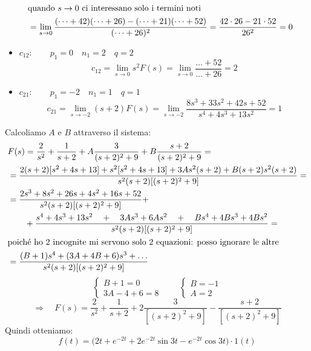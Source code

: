 \begin{mdframed}[style=Exercise]
\begin{Exercise}[title={Poli reali multipli, poli complessi semplici}, difficulty=2]
\begin{itemize}
\begin{align*}
					\intertext{quando $ s \rightarrow 0 $ ci interessano solo i termini noti}
					&= \lim\limits_{s \rightarrow 0} \frac{(\dots + 42)(\dots + 26)-(\dots+21)(\dots+52)}{(\dots+26)^2} = \frac{42 \cdot 26 - 21 \cdot 52}{26^2} = 0
				\end{align*}
				\item $ c_{12}: \qquad p_1=0 \quad n_1=2 \quad q=2 $
				\[ c_{12}= \lim\limits_{s \rightarrow 0} s^2F(s) = \lim\limits_{s \rightarrow 0} \frac{\dots + 52}{\dots + 26} = 2 \]
				\item $ c_{21}: \qquad p_1=-2 \quad n_1=1 \quad q=1 $
				\[ c_{21} = \lim\limits_{s \rightarrow -2} (s+2)F(s) = \lim\limits_{s \rightarrow -2} \frac{8s^3+33s^2+42s+52}{s^4+4s^3+13s^2} = 1\]
			\end{itemize}
			\smallskip
			Calcoliamo $ A $ e $ B $ attraverso il sistema:
			\begin{align*}
				&F(s) = \frac{2}{s^2} + \frac{1}{s+2} + A \frac{3}{(s+2)^2+9} + B \frac{s+2}{(s+2)^2+9} =
				\\
				&= \frac{2(s+2)[s^2+4s+13] + s^2[s^2+4s+13] + 3As^2(s+2) + B(s+2)s^2(s+2)}{s^2(s+2)[(s+2)^2+9]} =
				\\
				&= \frac{2s^3 + 8s^2 + 26s + 4s^2 + 16s + 52}{s^2(s+2)[(s+2)^2+9]} +
				\\
				&\qquad + \dfrac{s^4 + 4s^3 + 13s^2 \quad+\quad 3As^3+6As^2 \quad+\quad Bs^4+4Bs^3+4Bs^2}{s^2(s+2)[(s+2)^2+9]} =
				\\
				\intertext{poich\'{e} ho 2 incognite mi servono solo 2 equazioni: posso ignorare le altre}
				&= \frac{(B+1)s^4 + (3A+4B+6)s^3 + \dots}{s^2(s+2)[(s+2)^2+9]}
			\end{align*}
			\[
				\begin{cases}
					B+1=0\\
					3A-4+6=8
				\end{cases}\qquad 
				\begin{cases}
					B=-1\\
					A=2
				\end{cases}								
			\]
			\[
				\Rightarrow\quad F(s) = \frac{2}{s^2} + \frac{1}{s+2} + 2 \frac{3}{[(s+2)^2+9]} - \frac{s+2}{[(s+2)^2+9]}
			\]
			Quindi otteniamo:
			\[
				f(t) = \big( 2t + e^{-2t} + 2e^{-2t}\sin3t - e^{-2t} \cos3t \big) \cdot 1(t)
			\]
		\end{Exercise}
	\end{mdframed}

